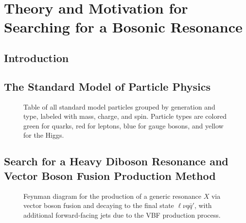 
\chapter{Theory and Motivation for Searching for a Bosonic Resonance}
\label{chap:theory}

\section{Introduction}

\section{The Standard Model of Particle Physics}
\label{sec:SM}
\begin{figure}[htbp]
  \centering
  
  \caption{Table of all standard model particles grouped by generation and type, labeled with mass, charge, and spin. Particle types are colored green for quarks, red for leptons, blue for gauge bosons, and yellow for the Higgs.}
  \label{fig:standardModel}
\end{figure}

\section{Search for a Heavy Diboson Resonance and Vector Boson Fusion Production Method}
\label{sec:VBF}
\begin{figure}[htbp]
  \centering
  
  \caption{Feynman diagram for the production of a generic resonance $X$ via vector boson fusion and decaying to the final state $\ell\nu q\bar{q}'$, with additional forward-facing jets due to the VBF production process.}
  \label{fig:vbfFeynman}
\end{figure}
